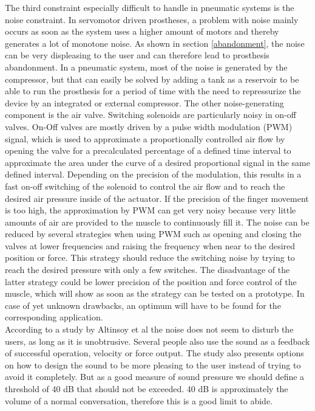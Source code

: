 \documentclass[main]{subfiles}
\begin{document}
The third constraint especially difficult to handle in pneumatic systems is the noise constraint. In servomotor driven prostheses, a problem with noise mainly occurs as soon as the system uses a higher amount of motors and thereby generates a lot of monotone noise. As shown in section \ref{abandonment}, the noise can be very displeasing to the user and can therefore lead to prosthesis abandonment. In a pneumatic system, most of the noise is generated by the compressor, but that can easily be solved by adding a tank as a reservoir to be able to run the prosthesis for a period of time with the need to repressurize the device by an integrated or external compressor. The other noise-generating component is the air valve. Switching solenoids are particularly noisy in on-off valves. On-Off valves are mostly driven by a pulse width modulation (PWM) signal, which is used to approximate a proportionally controlled air flow by opening the valve for a precalculated percentage of a defined time interval to approximate the area under the curve of a desired proportional signal in the same defined interval. Depending on the precision of the modulation, this results in a fast on-off switching of the solenoid to control the air flow and to reach the desired air pressure inside of the actuator. If the precision of the finger movement is too high, the approximation by PWM can get very noisy because very little amounts of air are provided to the muscle to continuously fill it. The noise can be reduced by several strategies when using PWM such as opening and closing the valves at lower frequencies and raising the frequency when near to the desired position or force. This strategy should reduce the switching noise by trying to reach the desired pressure with only a few switches. The disadvantage of the latter strategy could be lower precision of the position and force control of the muscle, which will show as soon as the strategy can be tested on a prototype. In case of yet unknown drawbacks, an optimum will have to be found for the corresponding application.\\
According to a study by Altinsoy et al \cite{Altinsoy2010} the noise does not seem to disturb the users, as long as it is unobtrusive. Several people also use the sound as a feedback of successful operation, velocity or force output. The study also presents options on how to design the sound to be more pleasing to the user instead of trying to avoid it completely. But as a good measure of sound pressure we should define a threshold of 40 dB that should not be exceeded. 40 dB is approximately the volume of a normal conversation, therefore this is a good limit to abide.
\end{document}
